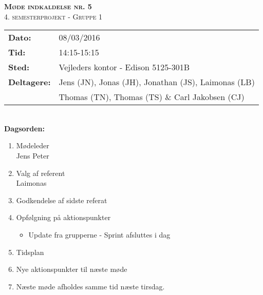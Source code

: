 
\newcommand{\HRule}{\rule{\linewidth}{0.1mm}}


	\begin{center}
		{\huge \bfseries \textsc{Møde indkaldelse nr. 5}}\\
		\textsc{\large 4. semesterprojekt - Gruppe 1}\\[0.3cm]
	\end{center}
	\begin{tabular}{ll}
	\large \textbf{Dato:} & 08/03/2016  \\ %
	\large \textbf{Tid:}  & 14:15-15:15 \\ %
	\large \textbf{Sted:} & Vejleders kontor - Edison 5125-301B		\\ %
	\large \textbf{Deltagere:} & Jens (JN), Jonas (JH), Jonathan (JS), Laimonas (LB) \\
	\large \textbf & Thomas (TN),  Thomas (TS) \& Carl Jakobsen (CJ)\\
	\end{tabular}\\
	\phantom{\,}\hspace{0.1em} \large \textbf{Dagsorden:}
	\begin{enumerate}
		\itemsep 0.3em 
		\item Mødeleder\\
			Jens Peter\\
		\item Valg af referent\\
			Laimonas\\
		\item Godkendelse af sidste referat\\
		\item Opfølgning på aktionspunkter
		\begin{itemize}
			\itemsep 0.3em 
			\item Update fra grupperne - Sprint afsluttes i dag\\
		\end{itemize}
		\item Tidsplan\\
		\item Nye aktionspunkter til næste møde\\
		\item Næste møde afholdes samme tid næste tirsdag.
	\end{enumerate}
